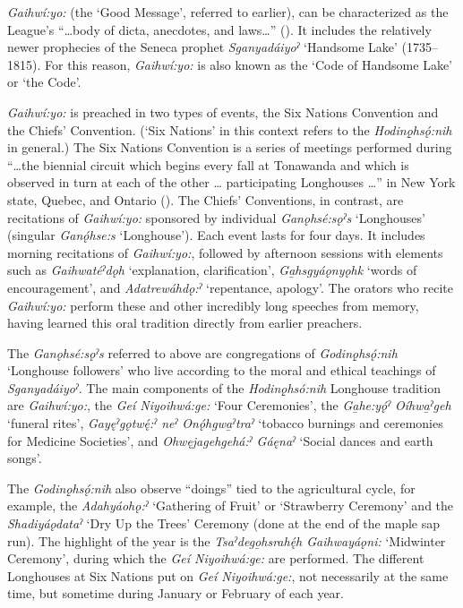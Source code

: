 \textit{Gaihwí:yo:} (the ‘Good Message’, referred to earlier), can be characterized as the League’s “…body of dicta, anecdotes, and laws…” (\cite[192]{shimony_conservatism_1994}). It includes the relatively newer prophecies of the Seneca prophet \textit{Sganyadáiyoˀ} ‘Handsome Lake’ (1735--1815). For this reason, \textit{Gaihwí:yo:} is also known as the ‘Code of Handsome Lake’ or ‘the Code’. 

\textit{Gaihwí:yo:} is preached in two types of events, the Six Nations Convention and the Chiefs’ Convention. (‘Six Nations’ in this context refers to the \textit{Hodinǫ̱hsǫ́:nih} in general.) The Six Nations Convention is a series of meetings performed during “…the biennial circuit which begins every fall at Tonawanda and which is observed in turn at each of the other … participating Longhouses …” in New York state, Quebec, and Ontario (\cite[192]{shimony_conservatism_1994}). The Chiefs’ Conventions, in contrast, are recitations of \textit{Gaihwí:yo:} sponsored by individual \textit{Ganǫhsé:sǫˀs} ‘Longhouses’ (singular \textit{Ganǫ́hse:s} ‘Longhouse’). Each event lasts for four days. It includes morning recitations of \textit{Gaihwí:yo:}, followed by afternoon sessions with elements such as \textit{Gaihwatéˀdǫh} ‘explanation, clarification’, \textit{Ga̱hsgyáǫnyǫhk} ‘words of encouragement’, and \textit{Adatrewáhdǫ:ˀ} ‘repentance, apology’. The orators who recite \textit{Gaihwí:yo:} perform these and other incredibly long speeches from memory, having learned this oral tradition directly from earlier preachers.

The \textit{Ganǫhsé:sǫˀs} referred to above are congregations of \textit{Godinǫ̱hsǫ́:nih} ‘Longhouse followers’ who live according to the moral and ethical teachings of \textit{Sganya\-dáiyoˀ}. The main components of the \textit{Hodinǫ̱hsó:nih} Longhouse tradition are \textit{Gaihwí:yo:}, the \textit{Geí Niyoihwá:ge:} ‘Four Ceremonies’, the \textit{Ga̱he:yǫ́ˀ Oíhwa̱ˀgeh} ‘funeral rites’, \textit{Gayęˀgǫtwę́:ˀ neˀ Onǫ́hgwa̱ˀtraˀ} ‘tobacco burnings and ceremonies for Medicine Societies’, and \textit{Ohwęjagehgehá:ˀ Gáęnaˀ} ‘Social dances and earth songs’.  

The \textit{Godinǫ̱hsǫ́:nih} also observe “doings” tied to the agricultural cycle, for example, the \textit{Adahyáohǫ:ˀ} ‘Gathering of Fruit’ or ‘Strawberry Ceremony’ and the \textit{Shadiyáǫdataˀ} ‘Dry Up the Trees’ Ceremony (done at the end of the maple sap run). The highlight of the year is the \textit{Tsaˀdego̱hsrahę́h Gaihwayáǫni:} ‘Midwinter Ceremony’, during which the \textit{Geí Niyoihwá:ge:} are performed. The different Longhouses at Six Nations put on \textit{Geí Niyoihwá:ge:}, not necessarily at the same time, but sometime during January or February of each year. 

